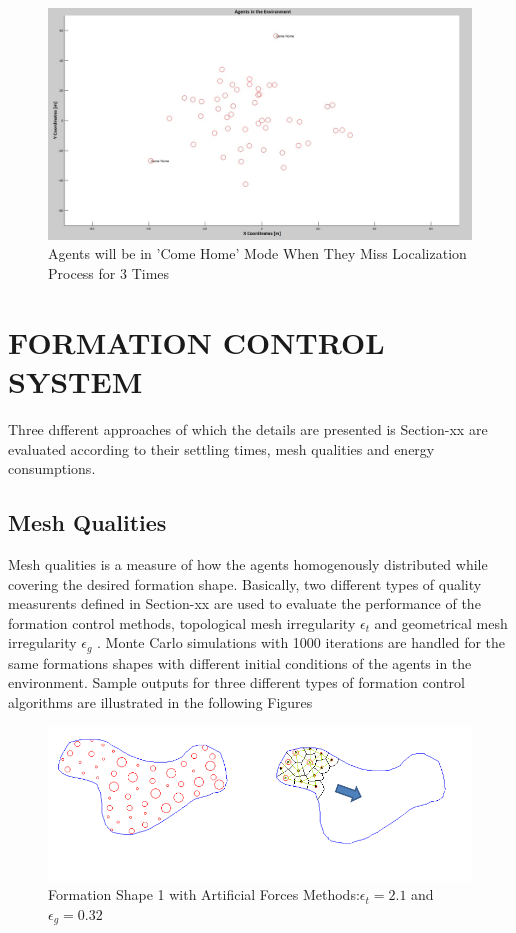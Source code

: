 \begin{figure}[H]
\caption{Agents will be in 'Come Home' Mode When They Miss Localization Process for 3 Times}
\centerline{\includegraphics[scale = 0.30]{Lost-2-3}}
\end{figure} 		
		
\section{FORMATION CONTROL SYSTEM}
Three dıfferent approaches of which the details are presented is Section-xx are evaluated according to their settling times, mesh qualities and energy consumptions. 

\subsection{Mesh Qualities} 
Mesh qualities is a measure of how the agents homogenously distributed while covering the desired formation shape. Basically, two different types of quality measurents defined in Section-xx are used to evaluate the performance of the formation control methods, topological mesh irregularity $\epsilon_t$ and geometrical mesh irregularity $\epsilon_g$ . Monte Carlo simulations with 1000 iterations are handled for the same formations shapes with different initial conditions of the agents in the environment. Sample outputs for three different types of formation control algorithms are illustrated in the following Figures
  
\begin{figure}[H]
\caption{Formation Shape 1 with Artificial Forces Methods:$\epsilon_t = 2.1$ and $\epsilon_g = 0.32$}
\centerline{\includegraphics[scale = 0.70]{Artificial_Forces_Mesh_1}}
\end{figure} 		
		
